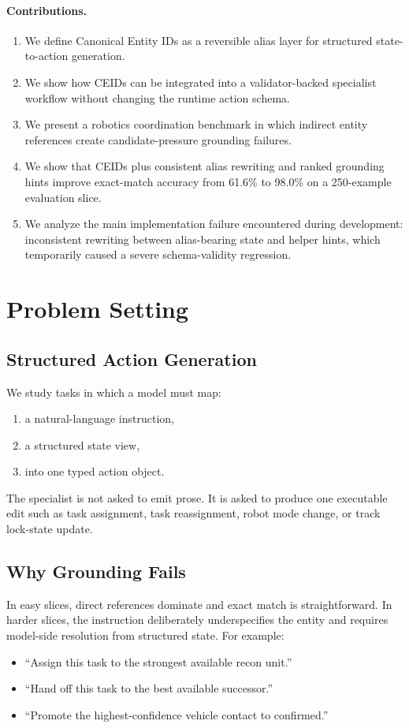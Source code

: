 \documentclass[11pt]{article}
\begin{document}
\paragraph{Contributions.}
\begin{enumerate}[leftmargin=*,itemsep=0.3em]
  \item We define Canonical Entity IDs as a reversible alias layer for structured state-to-action generation.
  \item We show how CEIDs can be integrated into a validator-backed specialist workflow without changing the runtime action schema.
  \item We present a robotics coordination benchmark in which indirect entity references create candidate-pressure grounding failures.
  \item We show that CEIDs plus consistent alias rewriting and ranked grounding hints improve exact-match accuracy from 61.6\% to 98.0\% on a 250-example evaluation slice.
  \item We analyze the main implementation failure encountered during development: inconsistent rewriting between alias-bearing state and helper hints, which temporarily caused a severe schema-validity regression.
\end{enumerate}

\section{Problem Setting}
\subsection{Structured Action Generation}
We study tasks in which a model must map:
\begin{enumerate}[leftmargin=*,itemsep=0.25em]
  \item a natural-language instruction,
  \item a structured state view,
  \item into one typed action object.
\end{enumerate}

The specialist is not asked to emit prose. It is asked to produce one executable edit such as task assignment, task reassignment, robot mode change, or track lock-state update.

\subsection{Why Grounding Fails}
In easy slices, direct references dominate and exact match is straightforward. In harder slices, the instruction deliberately underspecifies the entity and requires model-side resolution from structured state. For example:
\begin{itemize}[leftmargin=*]
  \item \enquote{Assign this task to the strongest available recon unit.}
  \item \enquote{Hand off this task to the best available successor.}
  \item \enquote{Promote the highest-confidence vehicle contact to confirmed.}
\end{itemize}
\end{document}
